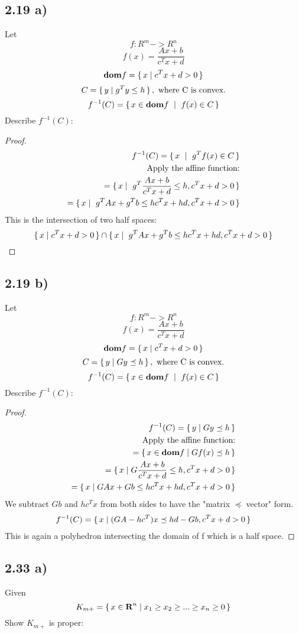 \documentclass[12pt]{article}
\begin{document}
\subsection*{2.19 a)}
Let 
$$f: R^m -> R^n$$
$$f(x) = \frac{Ax+b}{c^Tx +d}$$
$$\textbf{dom}f = \set{x | c^Tx + d > 0}$$
$$C = \set{y | g^Ty \le h},\ \text{where C is convex.}$$
$$f^{-1}(C) = \set{x \in \textbf{dom}f\ |\ f(x) \in C}$$ 
Describe $f^{-1}(C)$:
\begin{proof}
\begin{align*}
f^{-1}(C) = \set{x\ |\ g^Tf(x) \in C}\\
\text{Apply the affine function:}\\
= \set{x |\ g^T\frac{Ax+b}{c^Tx +d} \le h, c^Tx + d > 0}\\
= \set{x |\ g^TAx+g^Tb \le hc^Tx + hd, c^Tx + d > 0}\\
\end{align*}
This is the intersection of two half spaces:
$$ \set{x | c^Tx + d > 0} \cap \set{x |\ g^TAx+g^Tb \le hc^Tx + hd, c^Tx + d > 0}$$
\end{proof}

\subsection*{2.19 b)}
Let 
$$f: R^m -> R^n$$
$$f(x) = \frac{Ax+b}{c^Tx +d}$$
$$\textbf{dom}f = \set{x | c^Tx + d > 0}$$
$$C = \set{y | Gy \preceq h},\ \text{where C is convex.}$$
$$f^{-1}(C) = \set{x \in \textbf{dom}f\ |\ f(x) \in C}$$ 
Describe $f^{-1}(C)$:
\begin{proof}
\begin{align*}
f^{-1}(C) = \set{y | Gy \preceq h}\\
\text{Apply the affine function:}\\
= \set{x \in \textbf{dom}f | Gf(x) \preceq h}\\
= \set{x | G\frac{Ax+b}{c^Tx +d} \le h, c^Tx + d > 0}\\
= \set{x | GAx+Gb \le hc^Tx + hd, c^Tx + d > 0}\\
\end{align*}
We subtract $Gb$ and $hc^Tx$ from both sides to have the "matrix $\preceq$ vector" form.
\begin{align*}
f^{-1}(C) = \set{x | (GA-hc^T)x \preceq hd-Gb, c^Tx+d > 0}
\end{align*}
This is again a polyhedron intersecting the domain of f which is a half space.
\end{proof}

\subsection*{2.33 a)}
Given $$K_{m+} = \set{x \in \textbf{R}^n | x_1 \ge x_2 \ge ... \ge x_n \ge 0}$$
Show $K_{m+}$ is proper:\\
\end{document}
